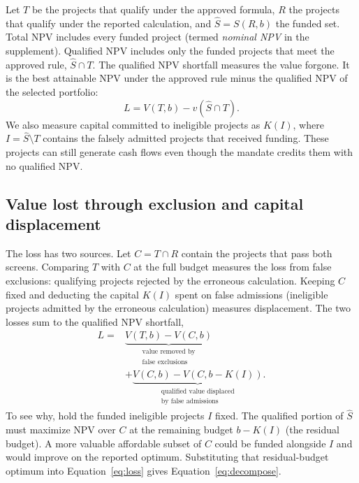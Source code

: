 Let $T$ be the projects that qualify under the approved formula, $R$ the projects that qualify under the reported calculation, and $\widehat S=S(R,b)$ the funded set. Total NPV includes every funded project (termed \emph{nominal NPV} in the supplement). Qualified NPV includes only the funded projects that meet the approved rule, $\widehat S\cap T$. The qualified NPV shortfall measures the value forgone. It is the best attainable NPV under the approved rule minus the qualified NPV of the selected portfolio:
\begin{equation}
 L=V(T,b)-v(\widehat S\cap T). \label{eq:loss}
\end{equation}
We also measure capital committed to ineligible projects as $K(I)$, where $I=\widehat S\setminus T$ contains the falsely admitted projects that received funding. These projects can still generate cash flows even though the mandate credits them with no qualified NPV.

\subsection{Value lost through exclusion and capital displacement}
The loss has two sources. Let $C=T\cap R$ contain the projects that pass both screens. Comparing $T$ with $C$ at the full budget measures the loss from false exclusions: qualifying projects rejected by the erroneous calculation. Keeping $C$ fixed and deducting the capital $K(I)$ spent on false admissions (ineligible projects admitted by the erroneous calculation) measures displacement. The two losses sum to the qualified NPV shortfall,
\begin{equation}
\begin{aligned}
L={}&\underbrace{V(T,b)-V(C,b)}_{\substack{\text{value removed by}\\\text{false exclusions}}}\\
&+\underbrace{V(C,b)-V(C,b-K(I))}_{\substack{\text{qualified value displaced}\\\text{by false admissions}}} .
\end{aligned}
\label{eq:decompose}
\end{equation}
To see why, hold the funded ineligible projects $I$ fixed. The qualified portion of $\widehat S$ must maximize NPV over $C$ at the remaining budget $b-K(I)$ (the residual budget). A more valuable affordable subset of $C$ could be funded alongside $I$ and would improve on the reported optimum. Substituting that residual-budget optimum into Equation~\eqref{eq:loss} gives Equation~\eqref{eq:decompose}.

